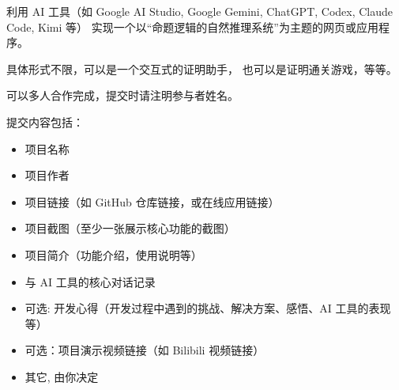 \documentclass[a4paper, justified]{tufte-handout}
\begin{document}
\newpage
\begin{problem}
  利用 AI 工具（如 Google AI Studio, Google Gemini,
  ChatGPT, Codex, Claude Code, Kimi 等）
  实现一个以``命题逻辑的自然推理系统''为主题的网页或应用程序。

  具体形式不限，可以是一个交互式的证明助手，
  也可以是证明通关游戏，等等。

  可以多人合作完成，提交时请注明参与者姓名。

  提交内容包括：
  \begin{itemize}
    \item 项目名称
    \item 项目作者
    \item 项目链接（如 GitHub 仓库链接，或在线应用链接）
    \item 项目截图（至少一张展示核心功能的截图）
    \item 项目简介（功能介绍，使用说明等）
    \item 与 AI 工具的核心对话记录
    \item 可选: 开发心得（开发过程中遇到的挑战、解决方案、感悟、AI 工具的表现等）
    \item 可选：项目演示视频链接（如 Bilibili 视频链接）
    \item 其它, 由你决定
  \end{itemize}
\end{problem}
\end{document}
